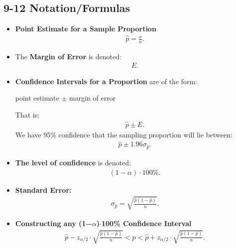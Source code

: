 \documentclass{report}
\begin{document}
        \pagebreak 
        \subsection*{9-12 Notation/Formulas}
        \begin{itemize}
                  \item \textbf{Point Estimate for a Sample Proportion}
            \begin{align*}
                \hat{p} = \frac{x}{n}
            .\end{align*}
        \item The \textbf{Margin of Error} is denoted:
            \begin{align*}
                E 
            .\end{align*}
        \item \textbf{Confidence Intervals for a Proportion} are of the form:
            \begin{center}
                point estimate $\pm $ margin of error
            \end{center}
            That is:
            \begin{align*}
               \hat{p} \pm E 
            .\end{align*}
            We have 95\% confidence that the sampling proportion will lie between:
            \begin{align*}
                \hat{p} \pm 1.96 \sigma_{\hat{p}}  
            .\end{align*}
        \item \textbf{The level of confidence} is denoted:
            \begin{align*}
                (1-\alpha) \cdot 100\%
            .\end{align*}
        \item \textbf{Standard Error:}
            \begin{align*}
                \sigma_{\hat{p}} = \sqrt{\frac{\hat{p}(1-\hat{p})}{n}}
            .\end{align*}
        \item \textbf{Constructing any (1−$\alpha $)$\cdot  $100\% Confidence Interval}
            \begin{align*}
                \hat{p} - z_{\alpha/2} \cdot \sqrt{\frac{\hat{p}(1-\hat{p})}{n}} < p < \hat{p} + z_{\alpha/2} \cdot \sqrt{\frac{\hat{p}(1-\hat{p})}{n}}
            .\end{align*}


\end{itemize}
\end{document}
